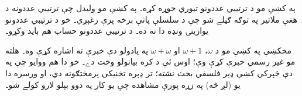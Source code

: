 \documentclass[../../../include/open-logic-section]{subfiles}
\begin{document}


په  کښې مو د ترتيبي عددونو تيوري جوړه کړه۔
په  کښې مو وليدل چې ترتيبي عددونه د هغې
ملاتير په توګه ګڼلے شو چې د سلسلې پاتې برخه پرې رغېږي۔ خو د
ترتيبي عددونو يوازينۍ ونډه دا نه ده۔ د ترتيبي عددونو حساب هم بايد وکړو۔

مخکښې په  کښې مو د $\omega$،
$\omega+1$ او $\omega+\omega$ په يادولو دې خبرې ته اشاره کړې وه۔
هلته مو غير رسمي خبرې کړې وې؛ اوس ئې د کره بيانولو وخت دے۔ خو دا
هم ووايو چې په دې څپرکي کښې ډېر فلسفي بحث نشته؛ تر ډېره تخنيکي
پرمختګونه دي، او ورسره دا يو (لږ څه) په زړه پورې مشاهده چې يو کار
په دوو بېلو لارو کولے شو۔
\end{document}
